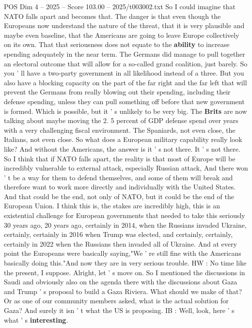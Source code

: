 \begin{textsample}{POS Dim 4 – 2025 – Score 103.00 – 2025/t003002.txt}
So I could imagine that NATO falls apart and becomes that.
The danger is that even though the Europeans now understand the nature of the threat, that it is very plausible and maybe even baseline, that the Americans are going to leave Europe collectively on its own.
That that seriousness does not equate to the \textbf{ability} to increase spending adequately in the near term.
The Germans did manage to pull together an electoral outcome that will allow for a so-called grand coalition, just barely.
So you ' ll have a two-party government in all likelihood instead of a three.
But you also have a blocking capacity on the part of the far right and the far left that will prevent the Germans from really blowing out their spending, including their defense spending, unless they can pull something off before that new government is formed.
Which is possible, but it ' s unlikely to be very big.
The \textbf{Brits} are now talking about maybe moving the 2. 5 percent of GDP defense spend over years with a very challenging fiscal environment.
The Spaniards, not even close, the Italians, not even close.
So what does a European military capability really look like?
And without the Americans, the answer is it ' s not there.
It ' s not there.
So I think that if NATO falls apart, the reality is that most of Europe will be incredibly vulnerable to external attack, especially Russian attack, And there won ' t be a way for them to defend themselves, and some of them will break and therefore want to work more directly and individually with the United States.
And that could be the end, not only of NATO, but it could be the end of the European Union.
I think this is, the stakes are incredibly high, this is an existential challenge for European governments that needed to take this seriously 30 years ago, 20 years ago, certainly in 2014, when the Russians invaded Ukraine, certainly, certainly in 2016 when Trump was elected, and certainly, certainly, certainly in 2022 when the Russians then invaded all of Ukraine.
And at every point the Europeans were basically saying,"We ' re still fine with the Americans basically doing this."And now they are in very serious trouble.
HW : No time like the present, I suppose.
Alright, let ' s move on.
So I mentioned the discussions in Saudi and obviously also on the agenda there with the discussions about Gaza and Trump ' s proposal to build a Gaza Riviera.
What should we make of that?
Or as one of our community members asked, what is the actual solution for Gaza?
And surely it isn ' t what the US is proposing.
IB : Well, look, here ' s what ' s \textbf{interesting}.

\end{textsample}
